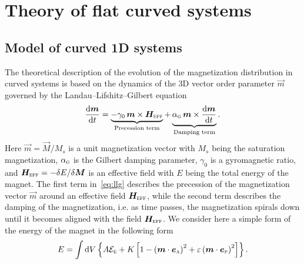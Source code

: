 \section{Theory of flat curved systems}\label{sec:theory_1D}

\subsection{Model of curved 1D systems}\label{sec:model_1D}

The theoretical description of the evolution of the magnetization distribution in curved systems is based on the dynamics of the 3D vector order parameter $\vec{m}$ governed by the Landau--Lifshitz--Gilbert equation
\begin{equation}\label{eq:llg}
    \frac{\mathrm{d}\vec{m}}{\mathrm{d}t}=\underbrace{-\gamma_0\, \vec{m}\times\vec{H}_\textsc{eff}}_{\text{Precession term}} + \underbrace{\alpha_\textsc{g}\, \vec{m}\times\frac{\mathrm{d}\vec{m}}{\mathrm{d}t}}_{\text{Damping term}}.
\end{equation}
Here $\vec{m}=\vec{M}/M_s$ is a unit magnetization vector with $M_s$ being the saturation magnetization, $\alpha_\textsc{g}$ is the Gilbert damping parameter, $\gamma_0$ is a gyromagnetic ratio, and $\vec{H}_\textsc{eff}=-\delta E/\delta\vec{M}$ is an effective field with $E$ being the total energy of the magnet. The first term in~\eqref{eq:llg} describes the precession of the magnetization vector $\vec{m}$ around an effective field $\vec{H}_\textsc{eff}$, while the second term describes the damping of the  magnetization, i.e. as time passes, the magnetization spirals down until it becomes aligned with the field $\vec{H}_\textsc{eff}$.  We consider here a simple form of the energy of the magnet in the following form%
\begin{equation}\label{eq:total_energy}
	E=\int\mathrm{d}V\left\{A\mathcal{E}_\textsc{e}+K\left[1-\left(\vec{m}\cdot\vec{e}_\textsc{a}\right)^2+\varepsilon\left(\vec{m}\cdot\vec{e}_\textsc{p}\right)^2\right]\right\}.
\end{equation}
